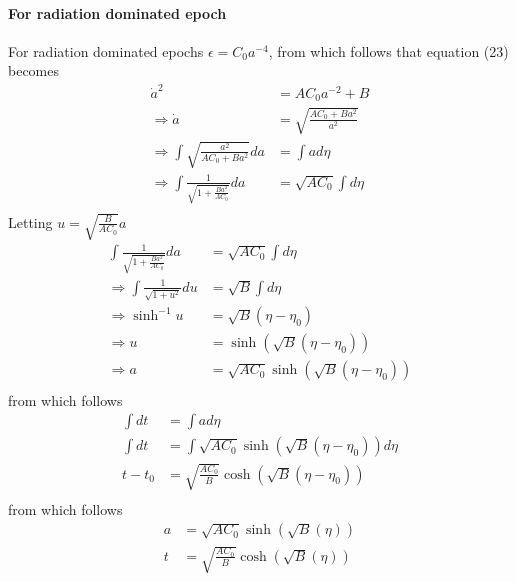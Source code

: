 \documentclass[a4paper, 11pt]{FSKH_623_Report}
\numberwithin{equation}{section}
\newcommand{\brac}[1]{\left(#1\right)}
\begin{document}
\paragraph*{For radiation dominated epoch}
For radiation dominated epochs $\epsilon=C_{0}a^{-4}$, from which follows that equation (23) becomes
\begin{equation}
\begin{split}
\dot{a}^{2} &= AC_{0}a^{-2}+B\\
\Rightarrow \dot{a} &= \sqrt{\frac{AC_{0}+Ba^{2}}{a^{2}}}\\
\Rightarrow \int\sqrt{\frac{a^{2}}{AC_{0}+Ba^{2}}}da &= \int ad\eta \\
\Rightarrow \int\frac{1}{\sqrt{1+\frac{Ba^{2}}{AC_{0}}}}da &= \sqrt{AC_{0}}\int d\eta \\
\end{split}
\end{equation}
Letting $u=\sqrt{\frac{B}{AC_{0}}}a$
\begin{equation}
\begin{split}
\int\frac{1}{\sqrt{1+\frac{Ba^{2}}{AC_{0}}}}da &= \sqrt{AC_{0}}\int d\eta \\
\Rightarrow \int\frac{1}{\sqrt{1+u^{2}}}du &= \sqrt{B}\int d\eta \\
\Rightarrow \sinh^{-1}u &= \sqrt{B}\brac{\eta-\eta_{0}} \\
\Rightarrow u &= \sinh\brac{\sqrt{B}\brac{\eta-\eta_{0}}} \\
\Rightarrow a &= \sqrt{AC_{0}}\sinh\brac{\sqrt{B}\brac{\eta-\eta_{0}}} \\
\end{split}
\end{equation}
from which follows 
\begin{equation}
\begin{split}
\int dt &= \int ad\eta\\
\int dt &= \int \sqrt{AC_{0}}\sinh\brac{\sqrt{B}\brac{\eta-\eta_{0}}} d\eta\\
t-t_{0} &= \sqrt{\frac{AC_{0}}{B}}\cosh\brac{\sqrt{B}\brac{\eta-\eta_{0}}}\\
\end{split}
\end{equation}
from which follows
\begin{equation}
\begin{split}
a &= \sqrt{AC_{0}}\sinh\brac{\sqrt{B}\brac{\eta}} \\
t &= \sqrt{\frac{AC_{0}}{B}}\cosh\brac{\sqrt{B}\brac{\eta}}
\end{split}
\end{equation}
\end{document}

